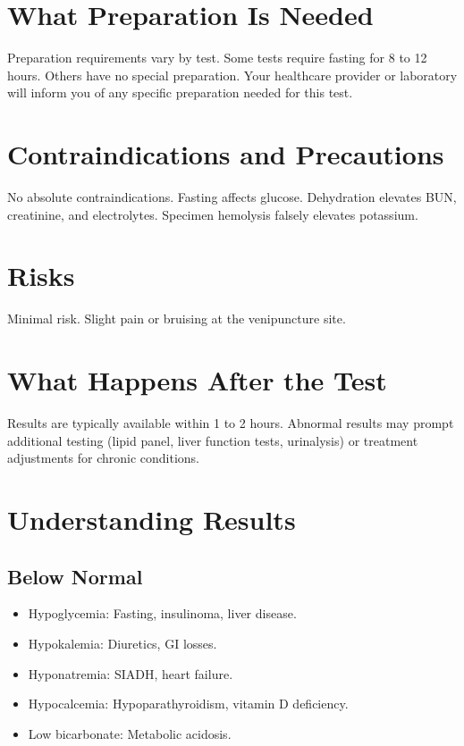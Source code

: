 \section*{What Preparation Is Needed}
Preparation requirements vary by test. Some tests require fasting for 8 to 12 hours. Others have no special preparation. Your healthcare provider or laboratory will inform you of any specific preparation needed for this test.

\section*{Contraindications and Precautions}
No absolute contraindications. Fasting affects glucose. Dehydration elevates BUN, creatinine, and electrolytes. Specimen hemolysis falsely elevates potassium.

\section*{Risks}
Minimal risk. Slight pain or bruising at the venipuncture site.

\section*{What Happens After the Test}
Results are typically available within 1 to 2 hours. Abnormal results may prompt additional testing (lipid panel, liver function tests, urinalysis) or treatment adjustments for chronic conditions.

\section*{Understanding Results}

\subsection*{Below Normal}
\begin{itemize}
  \item Hypoglycemia: Fasting, insulinoma, liver disease.
  \item Hypokalemia: Diuretics, GI losses.
  \item Hyponatremia: SIADH, heart failure.
  \item Hypocalcemia: Hypoparathyroidism, vitamin D deficiency.
  \item Low bicarbonate: Metabolic acidosis.
\end{itemize}

